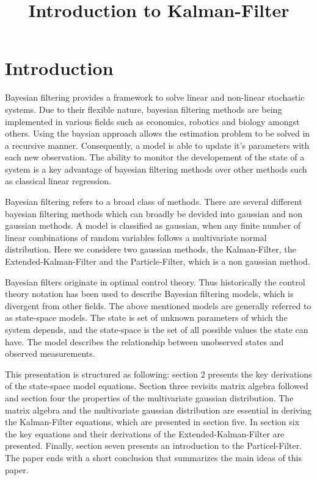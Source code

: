 \documentclass[
]{article}
\title{Introduction to Kalman-Filter}
\author{}
\date{\vspace{-2.5em}}
\begin{document}
\maketitle

\hypertarget{introduction}{%
\section{Introduction}\label{introduction}}

Bayesian filtering provides a framework to solve linear and non-linear
stochastic systems. Due to their flexible nature, bayesian filtering
methods are being implemented in various fields such as economics,
robotics and biology amongst others. Using the baysian approach allows
the estimation problem to be solved in a recursive manner. Consequently,
a model is able to update it's parameters with each new observation. The
ability to monitor the developement of the state of a system is a key
advantage of bayesian filtering methods over other methods such as
classical linear regression.

Bayesian filtering refers to a broad class of methods. There are several
different bayesian filtering methods which can broadly be devided into
gaussian and non gaussian methods. A model is classified as gaussian,
when any finite number of linear combinations of random variables
follows a multivariate normal distribution. Here we considere two
gaussian methods, the Kalman-Filter, the Extended-Kalman-Filter and the
Particle-Filter, which is a non gaussian method.

Bayesian filters originate in optimal control theory. Thus historically
the control theory notation has been used to describe Bayesian filtering
models, which is divergent from other fields. The above mentioned models
are generally referred to as state-space models. The state is set of
unknown parameters of which the system depends, and the state-space is
the set of all possible values the state can have. The model describes
the relationship between unobserved states and observed measurements.

This presentation is structured as following: section 2 presents the key
derivations of the state-space model equations. Section three revisits
matrix algebra followed and section four the properties of the
multivariate gaussian distribution. The matrix algebra and the
multivariate gaussian distribution are essential in deriving the
Kalman-Filter equations, which are presented in section five. In section
six the key equations and their derivations of the
Extended-Kalman-Filter are presented. Finally, section seven presents an
introduction to the Particel-Filter. The paper ends with a short
conclusion that summarizes the main ideas of this paper.
\end{document}
